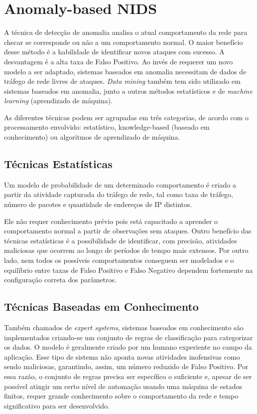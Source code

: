 \chapter{Anomaly-based NIDS}
\label{ch:anids}
 A técnica de detecção de anomalia analisa o atual comportamento da rede para checar se corresponde ou não a um
 comportamento normal. O maior benefício desse método é a habilidade de identificar novos ataques com sucesso.
 A desvantagem é a alta taxa de Falso Positivo. Ao invés de requerer um novo modelo a ser adaptado, sistemas baseados
 em anomalia necessitam de dados de tráfego de rede livres de ataques. \textit{Data mining} também tem sido
 utilizado em sistemas baseados em anomalia, junto a outros métodos estatísticos e de \textit{machine learning}
 (aprendizado de máquina).
 \par As diferentes técnicas podem ser agrupadas em três categorias, de acordo com o processamento envolvido:
 estatístico, knowledge-based (baseado em conhecimento) ou algoritmos de aprendizado de máquina.

\section{Técnicas Estatísticas}
Um modelo de probabilidade de um determinado comportamento é criado a partir da atividade capturada do tráfego de rede,
 tal como taxa de tráfego, número de pacotes e quantidade de endereços de IP distintos.
 \par Ele não requer conhecimento prévio pois está capacitado a aprender o comportamento normal a partir de observações
 sem ataques. Outro benefício das técnicas estatísticas é a possibilidade de identificar, com precisão, atividades
 maliciosas que ocorrem ao longo de períodos de tempo mais extensos. Por outro lado, nem todos os possíveis
 comportamentos conseguem ser modelados e o equilíbrio entre taxas de Falso Positivo e Falso Negativo dependem
 fortemente na configuração correta dos parâmetros.

 \section{Técnicas Baseadas em Conhecimento}
 Também chamados de \emph{expert systems}, sistemas baseados em conhecimento são implementados criando-se um conjunto de
 regras de classificação para categorizar os dados. O modelo é geralmente criado por um humano experiente no campo
 da aplicação. Esse tipo de sistema não aponta novas atividades inofensivas como sendo maliciosas, garantindo, assim,
 um número reduzido de Falso Positivo. Por essa razão, o conjunto de regras precisa ser específico o suficiente e,
 apesar de ser possível atingir um certo nível de automação usando uma máquina de estados finitos, requer
 grande conhecimento sobre o comportamento da rede e tempo significativo para ser desenvolvido.

